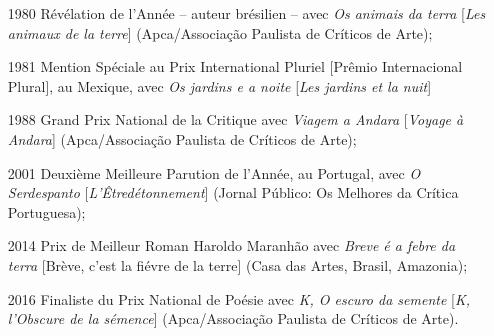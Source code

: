 \begin{enumerate}
\item[1980] Révélation de l'Année -- auteur brésilien -- avec \emph{Os animais
da terra} [\emph{Les animaux de la terre}] (Apca/Associação Paulista de Críticos de Arte);

\item[1981] Mention Spéciale au Prix International Pluriel [Prêmio
Internacional Plural], au Mexique, avec \emph{Os jardins e a noite} [\emph{Les jardins et la nuit}]

\item[1988] Grand Prix National de la Critique avec \emph{Viagem a Andara} [\emph{Voyage à Andara}]
(Apca/Associação Paulista de Críticos de Arte);

\item[2001] Deuxième Meilleure Parution de l'Année, au Portugal, avec \emph{O Serdespanto} [\emph{L'Êtredétonnement}] (Jornal Público: Os Melhores da Crítica Portuguesa);

\item[2014] Prix de Meilleur Roman Haroldo Maranhão avec \emph{Breve é a
febre da terra} [Brève, c'est la fiévre de la terre] (Casa das Artes, Brasil, Amazonia);

\item[2016] Finaliste du Prix National de Poésie avec \emph{K, O escuro da semente} [\emph{K, l'Obscure de la sémence}] (Apca/Associação Paulista de Críticos de Arte).
\end{enumerate}